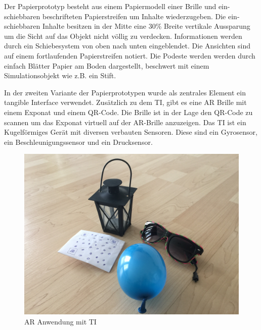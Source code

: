 \documentclass[runningheads,a4paper]{llncs}
\begin{document}
Der Papierprototyp besteht aus einem Papiermodell einer Brille und ein-schiebbaren beschrifteten Papierstreifen um Inhalte wiederzugeben.
Die ein-schiebbaren Inhalte besitzen in der Mitte eine 30\% Breite vertikale Aussparung um die Sicht auf das Objekt nicht völlig zu verdecken.
Informationen werden durch ein Schiebesystem von oben nach unten eingeblendet. Die Ansichten sind auf einem fortlaufenden Papierstreifen notiert.
Die Podeste werden werden durch einfach Blätter Papier am Boden dargestellt, beschwert mit einem Simulationsobjekt wie z.B. ein Stift.











In der zweiten Variante der Papierprototypen wurde als zentrales Element ein tangible Interface verwendet. Zusätzlich zu dem TI, gibt es eine AR Brille mit einem Exponat und einem QR-Code. Die Brille ist in der Lage den QR-Code zu scannen um das Exponat virtuell auf der AR-Brille anzuzeigen. Das TI ist ein Kugelförmiges Gerät mit diversen verbauten Sensoren. Diese sind ein Gyrosensor, ein Beschleunigungssensor und ein Drucksensor.

\begin{figure}[H]
	\centering
	\includegraphics[angle=0,scale=0.04]{proto2}
	\caption{AR Anwendung mit TI}
	\label{fig:prototype2}
\end{figure}
\end{document}

